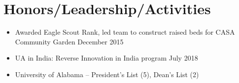 \documentclass[hidelinks, 11pt]{article}
\begin{document}
\section{Honors/Leadership/Activities}

\begin{itemize}
  \item Awarded Eagle Scout Rank, led team to construct raised beds for CASA Community Garden \hfill December 2015
  \item UA in India: Reverse Innovation in India program \hfill July 2018
  \item University of Alabama -- President's List (5), Dean's List (2)
\end{itemize}
\end{document}
